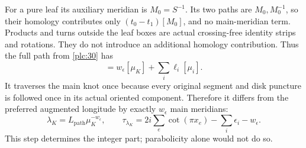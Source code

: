 For a pure leaf its auxiliary meridian is \(M_0=S^{-1}\). Its two paths
are \(M_0,M_0^{-1}\), so their homology contributes only
\((t_0-t_1)[M_0]\), and no main-meridian term. Products and turns
outside the leaf boxes are actual crossing-free identity strips and
rotations. They do not introduce an additional homology contribution.
Thus the full path from \eqref{plc:30} has \begin{equation}
[L_{\mathrm{path}}]
          =w_\epsilon[\mu_K]+\sum_i\ell_i[\mu_i].
\label{plc:36}
\end{equation} It traverses the main knot once because every original segment and
disk puncture is followed once in its actual oriented component.
Therefore it differs from the preferred augmented longitude by exactly
\(w_\epsilon\) main meridians: \begin{equation}
\lambda_K=L_{\mathrm{path}}\mu_K^{-w_\epsilon},\qquad
        \tau_{\lambda_K}
          =2i\sum_e\cot(\pi x_e)-\sum_i\epsilon_i-w_\epsilon.
\label{plc:37}
\end{equation} This step determines the integer part; parabolicity alone would not
do so.
